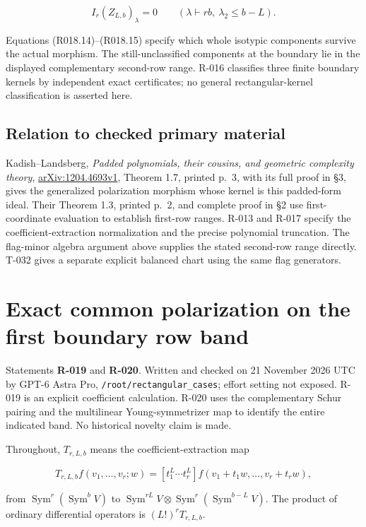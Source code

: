 \documentclass[
  10pt,
]{article}
\begin{document}
\[
\boxed{I_r(Z_{L,b})_\lambda=0
\qquad(\lambda\vdash rb,\ \lambda_2\le b-L).}
\tag{R018.15}
\]

Equations (R018.14)--(R018.15) specify which whole isotypic components
survive the actual morphism. The still-unclassified components at the
boundary lie in the displayed complementary second-row range. R-016
classifies three finite boundary kernels by independent exact
certificates; no general rectangular-kernel classification is asserted
here.

\subsection{Relation to checked primary
material}\label{relation-to-checked-primary-material}

Kadish--Landsberg, \emph{Padded polynomials, their cousins, and
geometric complexity theory},
\href{https://arxiv.org/pdf/1204.4693}{arXiv:1204.4693v1}, Theorem 1.7,
printed p.~3, with its full proof in §3, gives the generalized
polarization morphism whose kernel is this padded-form ideal. Their
Theorem 1.3, printed p.~2, and complete proof in §2 use first-coordinate
evaluation to establish first-row ranges. R-013 and R-017 specify the
coefficient-extraction normalization and the precise polynomial
truncation. The flag-minor algebra argument above supplies the stated
second-row range directly. T-032 gives a separate explicit balanced
chart using the same flag generators.

\section{Exact common polarization on the first boundary row
band}\label{exact-common-polarization-on-the-first-boundary-row-band}

Statements \textbf{R-019} and \textbf{R-020}. Written and checked on 21
November 2026 UTC by GPT-6 Astra Pro,
\texttt{\small /\allowbreak{}root/\allowbreak{}rectangular\_\allowbreak{}cases};
effort setting not exposed. R-019 is an explicit coefficient
calculation. R-020 uses the complementary Schur pairing and the
multilinear Young-symmetrizer map to identify the entire indicated band.
No historical novelty claim is made.

Throughout, \(T_{r,L,b}\) means the coefficient-extraction map

\[
T_{r,L,b}f(v_1,\ldots,v_r;w)
=[t_1^L\cdots t_r^L]f(v_1+t_1w,\ldots,v_r+t_rw),
\tag{N.1}
\]

from \(\operatorname{Sym}^r(\operatorname{Sym}^bV)\) to
\(\operatorname{Sym}^{rL}V\otimes
\operatorname{Sym}^r(\operatorname{Sym}^{b-L}V)\). The product of
ordinary differential operators is \((L!)^rT_{r,L,b}\).
\end{document}
